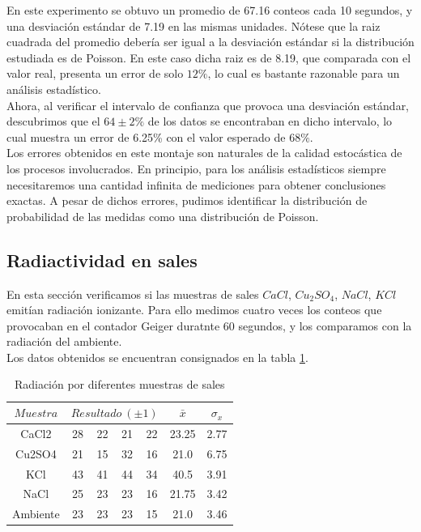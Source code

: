 \documentclass[%
 reprint,
 amsmath,amssymb,
 aps,
]{revtex4-1}
\begin{document}
En este experimento se obtuvo un promedio de 67.16 conteos cada 10 segundos, y una desviación estándar de    7.19 en las mismas unidades. Nótese que la raiz cuadrada del promedio debería ser igual a la desviación estándar si la distribución estudiada es de Poisson. En este caso dicha raiz es de 8.19, que comparada con el valor real, presenta un error de solo $12\%$, lo cual es bastante razonable para un análisis estadístico.\\

Ahora, al verificar el intervalo de confianza que provoca una desviación estándar, descubrimos que el $64\pm2\%$ de los datos se encontraban en dicho intervalo, lo cual muestra un error de 6.25\% con el valor esperado de $68\%$.\\

Los errores obtenidos en este montaje son naturales de la calidad estocástica de los procesos involucrados. En principio, para los análisis estadísticos siempre necesitaremos una cantidad infinita de mediciones para obtener conclusiones exactas. A pesar de dichos errores, pudimos identificar la distribución de probabilidad de las medidas como una distribución de Poisson.\\

\subsection{\label{sec:level2}Radiactividad en sales} 
En esta sección verificamos si las muestras de sales $CaCl$, $Cu_2SO_4$, $NaCl$, $KCl$ emitían radiación ionizante. Para ello medimos cuatro veces los conteos que provocaban en el contador Geiger duratnte 60 segundos, y los comparamos con la radiación del ambiente.\\

Los datos obtenidos se encuentran consignados en la tabla \ref{table:sales}.\\

\begin{table}[h!]
\centering
\begin{tabular}{|c|c|c|c|c|c|c|}
	\hline $ Muestra $ & \multicolumn{4}{c|}{$Resultado\ (\pm 1)$ } & $\bar{x}$& $\sigma_x$ \\ 
	\hline\hline
	CaCl2&28&22&21&22&23.25&2.77\\
	Cu2SO4&21&15&32&16&21.0&6.75\\
	KCl&43&41&44&34&40.5&3.91\\
	NaCl&25&23&23&16&21.75&3.42\\
	Ambiente&23&23&23&15&21.0&3.46\\
	[1ex] 
 \hline
 \end{tabular} 
  \caption{Radiación por diferentes muestras de sales}
\label{table:sales} 
\end{table}
\end{document}
